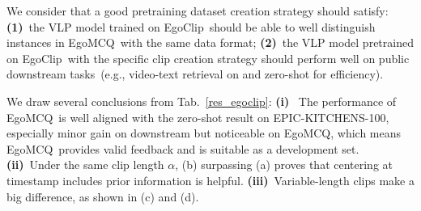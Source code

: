 \documentclass{article}
\newcommand{\dataset}{EgoClip}
\newcommand{\eval}{EgoMCQ}
\newcommand{\epic}{EPIC-KITCHENS-100}
\begin{document}
We consider that a good pretraining dataset creation strategy should satisfy: \textbf{(1)}~the VLP model trained on \dataset~should be able to well distinguish instances in \eval~with the same data format;
\textbf{(2)}~the VLP model pretrained on \dataset~with the specific clip creation strategy should perform well on public downstream tasks~(e.g., video-text retrieval on \cite{damen2022rescaling} and zero-shot for efficiency).

We draw several conclusions from Tab.~\ref{res_egoclip}:
\textbf{(i)}~
The performance of \eval~is well aligned with the zero-shot result on \epic, especially minor gain on downstream but noticeable on \eval,
which means \eval~provides valid feedback and is suitable as a development set.
\textbf{(ii)}~Under the same clip length $\alpha$, (b) surpassing (a) proves that centering at timestamp includes prior information is helpful.
\textbf{(iii)}~Variable-length clips make a big difference, 
as shown in (c) and (d).
\end{document}
